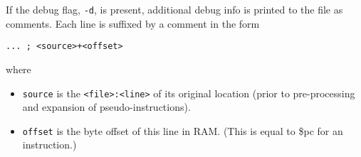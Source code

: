 \documentclass[10pt]{article}
\begin{document}
If the debug flag, \texttt{-d}, is present, additional debug info is printed to the file as comments.
Each line is suffixed by a comment in the form

\begin{lstlisting}[style=assembly]
... ; <source>+<offset>
\end{lstlisting}

where
\begin{itemize}
    \item \texttt{source} is the \texttt{<file>:<line>} of its original location (prior to pre-processing and expansion of pseudo-instructions).
    \item \texttt{offset} is the byte offset of this line in RAM.
    (This is equal to \$pc for an instruction.)
\end{itemize}
\end{document}
